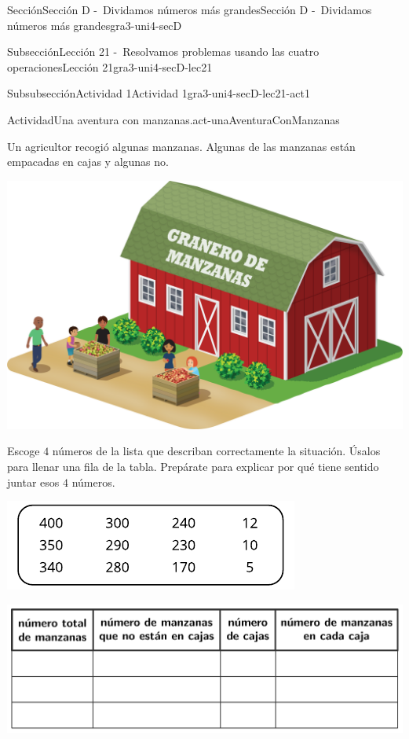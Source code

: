 \documentclass[twoside,10pt,]{article}
\begin{document}
\begin{sectionptx}{Sección}{Sección D -~Dividamos números más grandes}{}{Sección D -~Dividamos números más grandes}{}{}{gra3-uni4-secD}
\begin{subsectionptx}{Subsección}{Lección 21 -~Resolvamos problemas usando las cuatro operaciones}{}{Lección 21}{}{}{gra3-uni4-secD-lec21}
\begin{subsubsectionptx}{Subsubsección}{Actividad 1}{}{Actividad 1}{}{}{gra3-uni4-secD-lec21-act1}
\begin{activity}{Actividad}{Una aventura con manzanas.}{act-unaAventuraConManzanas}
\begin{sidebyside}{2}{0}{0}{0.1}%
\begin{sbspanel}{0.6}%
Un agricultor recogió algunas manzanas. Algunas de las manzanas están empacadas en cajas y algunas no.%
\end{sbspanel}%
\begin{sbspanel}{0.3}%
\includegraphics[width=\linewidth]{external/png-source/3.4.D21.S_Sp.png}
\end{sbspanel}%
\end{sidebyside}%
\par
Escoge \(4\) números de la lista que describan correctamente la situación. Úsalos para llenar una fila de la tabla. Prepárate para explicar por qué tiene sentido juntar esos \(4\) números.%
\begin{image}{0}{1}{0}{}%
\includegraphics[width=\linewidth]{external/svg-source/tikz-file-149345.pdf}
\end{image}%
\begin{image}{0}{1}{0}{}%
\includegraphics[width=\linewidth]{external/tikz-source/3-4-21-act1-tab.pdf}

\end{image}
\end{activity}
\end{subsubsectionptx}
\end{subsectionptx}
\end{sectionptx}
\end{document}
